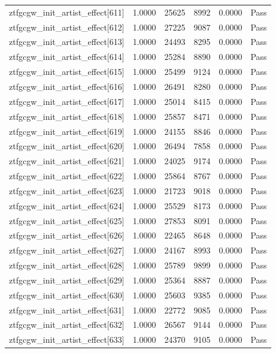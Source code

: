 \begin{table}[htbp]
\begin{tabular}{llrrll}
ztfgcgw\_init\_artist\_effect[611] & 1.0000 & 25625 & 8992 & 0.0000 & Pass \\
ztfgcgw\_init\_artist\_effect[612] & 1.0000 & 27225 & 9087 & 0.0000 & Pass \\
ztfgcgw\_init\_artist\_effect[613] & 1.0000 & 24493 & 8295 & 0.0000 & Pass \\
ztfgcgw\_init\_artist\_effect[614] & 1.0000 & 25284 & 8890 & 0.0000 & Pass \\
ztfgcgw\_init\_artist\_effect[615] & 1.0000 & 25499 & 9124 & 0.0000 & Pass \\
ztfgcgw\_init\_artist\_effect[616] & 1.0000 & 26491 & 8280 & 0.0000 & Pass \\
ztfgcgw\_init\_artist\_effect[617] & 1.0000 & 25014 & 8415 & 0.0000 & Pass \\
ztfgcgw\_init\_artist\_effect[618] & 1.0000 & 25857 & 8471 & 0.0000 & Pass \\
ztfgcgw\_init\_artist\_effect[619] & 1.0000 & 24155 & 8846 & 0.0000 & Pass \\
ztfgcgw\_init\_artist\_effect[620] & 1.0000 & 26494 & 7858 & 0.0000 & Pass \\
ztfgcgw\_init\_artist\_effect[621] & 1.0000 & 24025 & 9174 & 0.0000 & Pass \\
ztfgcgw\_init\_artist\_effect[622] & 1.0000 & 25864 & 8767 & 0.0000 & Pass \\
ztfgcgw\_init\_artist\_effect[623] & 1.0000 & 21723 & 9018 & 0.0000 & Pass \\
ztfgcgw\_init\_artist\_effect[624] & 1.0000 & 25529 & 8173 & 0.0000 & Pass \\
ztfgcgw\_init\_artist\_effect[625] & 1.0000 & 27853 & 8091 & 0.0000 & Pass \\
ztfgcgw\_init\_artist\_effect[626] & 1.0000 & 22465 & 8648 & 0.0000 & Pass \\
ztfgcgw\_init\_artist\_effect[627] & 1.0000 & 24167 & 8993 & 0.0000 & Pass \\
ztfgcgw\_init\_artist\_effect[628] & 1.0000 & 25789 & 9899 & 0.0000 & Pass \\
ztfgcgw\_init\_artist\_effect[629] & 1.0000 & 25364 & 8887 & 0.0000 & Pass \\
ztfgcgw\_init\_artist\_effect[630] & 1.0000 & 25603 & 9385 & 0.0000 & Pass \\
ztfgcgw\_init\_artist\_effect[631] & 1.0000 & 22772 & 9085 & 0.0000 & Pass \\
ztfgcgw\_init\_artist\_effect[632] & 1.0000 & 26567 & 9144 & 0.0000 & Pass \\
ztfgcgw\_init\_artist\_effect[633] & 1.0000 & 24370 & 9105 & 0.0000 & Pass \\

\end{tabular}
\end{table}
